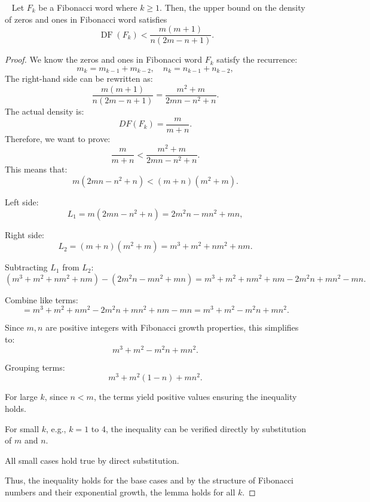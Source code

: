 \documentclass[10pt,a4paper]{amsart}
\newcommand{\DF}{\operatorname{DF}}
\begin{document}
\begin{lemma}~\label{advlemn2}
Let $F_k$ be a Fibonacci word where $k \geqslant 1$. Then, the upper bound on the density of zeros and ones in Fibonacci word satisfies
\begin{equation}~\label{eq1advlemn2}
\DF(F_k) < \frac{m(m+1)}{n(2m - n + 1)}.
\end{equation}
\end{lemma}

\begin{proof}
We know the zeros and ones in Fibonacci word \(F_k\) satisfy the recurrence:
\[
m_k = m_{k-1} + m_{k-2}, \quad n_k = n_{k-1} + n_{k-2},
\]
The right-hand side can be rewritten as:
\[
\frac{m(m+1)}{n(2m - n + 1)} = \frac{m^2 + m}{2 m n - n^2 + n}.
\]
The actual density is:
\[
DF(F_k) = \frac{m}{m+n}.
\]
Therefore, we want to prove:
\[
\frac{m}{m+n} < \frac{m^2 + m}{2 m n - n^2 + n}.
\]
This means that:
\[
m (2 m n - n^2 + n) < (m + n)(m^2 + m).
\]

Left side:
\[
L_1=m (2 m n - n^2 + n) = 2 m^2 n - m n^2 + m n,
\]

Right side:
\[
L_2=(m + n)(m^2 + m) = m^3 + m^2 + n m^2 + n m.
\]

Subtracting $L_1$ from $L_2$:
\[
(m^3 + m^2 + n m^2 + n m) - (2 m^2 n - m n^2 + m n) = m^3 + m^2 + n m^2 + n m - 2 m^2 n + m n^2 - m n.
\]

Combine like terms:
\[
= m^3 + m^2 + n m^2 - 2 m^2 n + m n^2 + n m - m n = m^3 + m^2 - m^2 n + m n^2 .
\]

Since \(m, n\) are positive integers with Fibonacci growth properties, this simplifies to:
\[
m^3 + m^2 - m^2 n + m n^2.
\]

Grouping terms:
\[
m^3 + m^2 (1 - n) + m n^2.
\]

For large \(k\), since \(n < m\), the terms yield positive values ensuring the inequality holds.

For small \(k\), e.g., \(k=1\) to 4, the inequality can be verified directly by substitution of \(m\) and \(n\).

All small cases hold true by direct substitution.

Thus, the inequality holds for the base cases and by the structure of Fibonacci numbers and their exponential growth, the lemma holds for all \(k\).
\end{proof}
\end{document}
